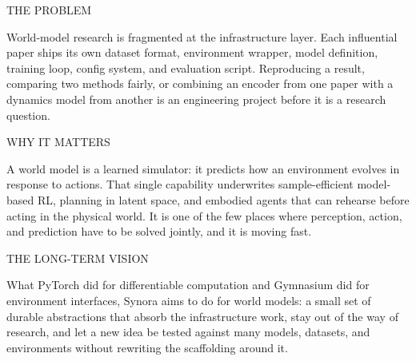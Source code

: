 \documentclass[10pt,a4paper]{article}
\newcommand{\kicker}[1]{{\footnotesize\displayfont\color{accent}\MakeUppercase{#1}}}
\begin{document}
\begin{minipage}[t]{0.315\textwidth}
  \kicker{The problem}\par\vspace{1.5mm}
  {\footnotesize
  World-model research is fragmented at the infrastructure layer. Each influential paper ships its
  own dataset format, environment wrapper, model definition, training loop, config system, and
  evaluation script. Reproducing a result, comparing two methods fairly, or combining an encoder
  from one paper with a dynamics model from another is an engineering project before it is a
  research question.}
\end{minipage}\hfill
\begin{minipage}[t]{0.315\textwidth}
  \kicker{Why it matters}\par\vspace{1.5mm}
  {\footnotesize
  A world model is a learned simulator: it predicts how an environment evolves in response to
  actions. That single capability underwrites sample-efficient model-based RL, planning in latent
  space, and embodied agents that can rehearse before acting in the physical world. It is one of
  the few places where perception, action, and prediction have to be solved jointly, and it is
  moving fast.}
\end{minipage}\hfill
\begin{minipage}[t]{0.315\textwidth}
  \kicker{The long-term vision}\par\vspace{1.5mm}
  {\footnotesize
  What PyTorch did for differentiable computation and Gymnasium did for environment interfaces,
  Synora aims to do for world models: a small set of durable abstractions that absorb the
  infrastructure work, stay out of the way of research, and let a new idea be tested against many
  models, datasets, and environments without rewriting the scaffolding around it.}
\end{minipage}

\vspace{5mm}
\end{document}
